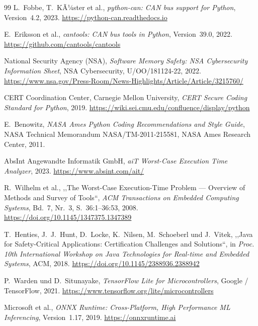 ﻿\documentclass[12pt,a4paper,twoside]{article}
\newcommand{\doi}[1]{\url{https://doi.org/#1}}
\begin{document}
\begin{thebibliography}{99}
  L.~Fobbe, T.~KÃ¼ster et al.,
  \textit{python-can: CAN bus support for Python},
  Version~4.2, 2023.
  \url{https://python-can.readthedocs.io}

  E.~Eriksson et al.,
  \textit{cantools: CAN bus tools in Python},
  Version~39.0, 2022.
  \url{https://github.com/cantools/cantools}


  {National Security Agency (NSA)},
  \textit{Software Memory Safety: NSA Cybersecurity Information Sheet},
  NSA Cybersecurity, U/OO/181124-22, 2022.
  \url{https://www.nsa.gov/Press-Room/News-Highlights/Article/Article/3215760/}

  {CERT Coordination Center, Carnegie Mellon University},
  \textit{CERT Secure Coding Standard for Python}, 2019.
  \url{https://wiki.sei.cmu.edu/confluence/display/python}

  E.~Benowitz,
  \textit{NASA Ames Python Coding Recommendations and Style Guide},
  NASA Technical Memorandum NASA/TM-2011-215581,
  NASA Ames Research Center, 2011.


  {AbsInt Angewandte Informatik GmbH},
  \textit{aiT Worst-Case Execution Time Analyzer}, 2023.
  \url{https://www.absint.com/ait/}

  R.~Wilhelm et al.,
  ,,The Worst-Case Execution-Time Problem --- Overview of Methods and
  Survey of Tools``,
  \textit{ACM Transactions on Embedded Computing Systems},
  Bd.~7, Nr.~3, S.~36:1--36:53, 2008.
  \doi{10.1145/1347375.1347389}

  T.~Henties, J.~J.~Hunt, D.~Locke, K.~Nilsen, M.~Schoeberl und J.~Vitek,
  ,,Java for Safety-Critical Applications: Certification Challenges and Solutions``,
  in \textit{Proc. 10th International Workshop on Java Technologies
  for Real-time and Embedded Systems}, ACM, 2018.
  \doi{10.1145/2388936.2388942}


  P.~Warden und D.~Situnayake,
  \textit{TensorFlow Lite for Microcontrollers},
  Google / TensorFlow, 2021.
  \url{https://www.tensorflow.org/lite/microcontrollers}

  {Microsoft et al.},
  \textit{ONNX Runtime: Cross-Platform, High Performance ML Inferencing},
  Version~1.17, 2019.
  \url{https://onnxruntime.ai}


\end{thebibliography}
\end{document}
